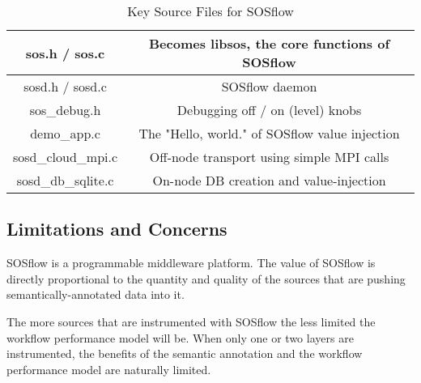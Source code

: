 \begin{table}[!t]
\renewcommand{\arraystretch}{1.3}
\caption{Key Source Files for SOSflow}
\label{table_example}
\centering
\begin{tabular}{|c|c|}
\hline %
sos.h / sos.c & Becomes libsos, the core functions of SOSflow\\
\hline %
sosd.h / sosd.c & SOSflow daemon\\
\hline %
sos\_debug.h & Debugging off / on (level) knobs\\
\hline %
demo\_app.c & The "Hello, world." of SOSflow value injection\\
\hline %
sosd\_cloud\_mpi.c & Off-node transport using simple MPI calls\\
\hline %
sosd\_db\_sqlite.c & On-node DB creation and value-injection\\
\hline %
\end{tabular}
\end{table}


\subsection{Limitations and Concerns}
SOSflow is a programmable middleware platform.  The value of SOSflow is
directly proportional to the quantity and quality of the sources that
are pushing semantically-annotated data into it.

The more sources that are instrumented with SOSflow the less limited
the workflow performance model will be. When only one or two layers
are instrumented, the benefits of the semantic annotation and the
workflow performance model are naturally limited.

